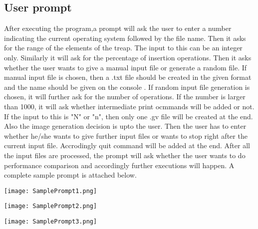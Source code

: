 \documentclass{article}
\begin{document}
\subsection{User prompt}
After executing the program,a prompt will ask the user to enter a number indicating the current operating system followed by the file name. Then it asks for the range of the elements of the treap. The input to this can be an integer only. Similarly it will ask for the percentage of insertion operations. Then it asks whether the user wants to give a manual input file or generate a random file. If manual input file is chosen, then a .txt file should be created in the given format and the name should be given on the console . If random input file generation is chosen, it will further ask for the number of operations. If the number is larger than 1000, it will ask whether intermediate print ocmmands will be added or not. If the input to this is "N" or "n", then only one .gv file will be created at the end. Also the image generation decision is upto the user. Then the user has to enter whether he/she wants to give further input files or wants to stop right after the current input file. Accrodingly quit command will be added at the end.\newline
After all the input files are processed, the prompt will ask whether the user wants to do performance comparison and accordingly further executions will happen. A complete sample prompt is attached below.
\begin{center}
\texttt{[image: SamplePrompt1.png]}
\end{center}
\begin{center}
\texttt{[image: SamplePrompt2.png]}
\end{center}
\begin{center}
\texttt{[image: SamplePrompt3.png]}
\end{center}
\end{document}
